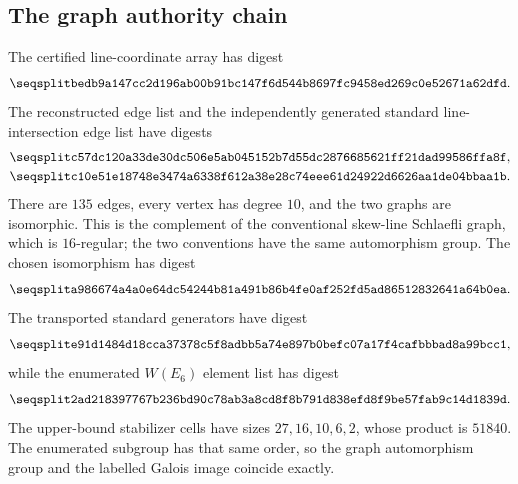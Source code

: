 \subsection{The graph authority chain}

The certified line-coordinate array has digest
\[
 \hexsha{bedb9a147cc2d196ab00b91bc147f6d544b8697fc9458ed269c0e52671a62dfd}.
\]
The reconstructed edge list and the independently generated standard
line-intersection edge list have digests
\begin{align*}
 &\hexsha{c57dc120a33de30dc506e5ab045152b7d55dc2876685621ff21dad99586ffa8f},\\
 &\hexsha{c10e51e18748e3474a6338f612a38e28c74eee61d24922d6626aa1de04bbaa1b}.
\end{align*}
There are $135$ edges, every vertex has degree $10$, and the two graphs
are isomorphic.  This is the complement of the conventional skew-line
Schlaefli graph, which is $16$-regular; the two conventions have the same
automorphism group.  The chosen isomorphism has digest
\[
 \hexsha{a986674a4a0e64dc54244b81a491b86b4fe0af252fd5ad86512832641a64b0ea}.
\]
The transported standard generators have digest
\[
 \hexsha{e91d1484d18cca37378c5f8adbb5a74e897b0befc07a17f4cafbbbad8a99bcc1},
\]
while the enumerated $W(E_6)$ element list has digest
\[
 \hexsha{2ad218397767b236bd90c78ab3a8cd8f8b791d838efd8f9be57fab9c14d1839d}.
\]
The upper-bound stabilizer cells have sizes $27,16,10,6,2$, whose product
is $51840$.  The enumerated subgroup has that same order, so the graph
automorphism group and the labelled Galois image coincide exactly.
